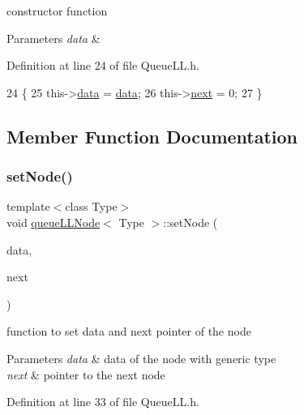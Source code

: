 constructor function 
\begin{DoxyParams}{Parameters}
{\em data} & \\
\hline
\end{DoxyParams}


Definition at line 24 of file Queue\+L\+L.\+h.


\begin{DoxyCode}
24                              \{
25         this->\hyperlink{classqueue_l_l_node_a20b1170d8c5852b7dc01e56fda4e4206}{data} = \hyperlink{classqueue_l_l_node_a20b1170d8c5852b7dc01e56fda4e4206}{data};
26         this->\hyperlink{classqueue_l_l_node_ab8367d61c51828d9f21d72537b62735f}{next} = 0;
27     \}
\end{DoxyCode}


\subsection{Member Function Documentation}
\mbox{\label{classqueue_l_l_node_ac264831406ec126a6ece6b5522d89dcd}} 
\subsubsection{\texorpdfstring{set\+Node()}{setNode()}}
{\footnotesize\ttfamily template$<$class Type$>$ \\
void \hyperlink{classqueue_l_l_node}{queue\+L\+L\+Node}$<$ Type $>$\+::set\+Node (\begin{DoxyParamCaption}\item[{Type $\ast$}]{data,  }\item[{\hyperlink{classqueue_l_l_node}{queue\+L\+L\+Node}$<$ Type $>$ $\ast$}]{next }\end{DoxyParamCaption})\hspace{0.3cm}{\ttfamily [inline]}}

function to set data and next pointer of the node 
\begin{DoxyParams}{Parameters}
{\em data} & data of the node with generic type \\
\hline
{\em next} & pointer to the next node \\
\hline
\end{DoxyParams}


Definition at line 33 of file Queue\+L\+L.\+h.


